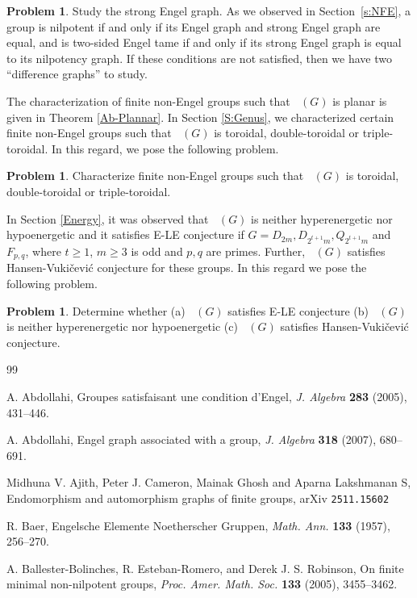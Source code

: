 \documentclass[reqno,12pt]{amsart}
\theoremstyle{plain}
\theoremstyle{definition}
\newtheorem{prob}[conj]{Problem}
\newcommand{\coeng}{\mathop{\mathcal{E}_c^-}}
\begin{document}
{\begin{prob}
Study the strong Engel graph. As we observed in Section~\ref{s:NFE},
a group is nilpotent if and only if its Engel graph and strong Engel graph are
equal, and is two-sided Engel tame if and only if its strong Engel graph is
equal to its nilpotency graph. If these conditions are not satisfied, then we
have two ``difference graphs'' to study.
\end{prob}

The characterization of finite non-Engel groups such that $\coeng(G)$ is planar is given in Theorem \ref{Ab-Plannar}. In Section \ref{S:Genus}, we characterized certain finite non-Engel groups such that $\coeng(G)$ is toroidal, double-toroidal or triple-toroidal. In this regard, we pose the following problem.
\begin{prob}
Characterize finite  non-Engel groups such that $\coeng(G)$ is  toroidal, double-toroidal or triple-toroidal.   
\end{prob}
In Section \ref{Energy}, it was observed that $\coeng(G)$ is neither hyperenergetic nor hypoenergetic and it satisfies E-LE conjecture if $G = D_{2m}, D_{2^{t+1}m}, Q_{2^{t+1}m}$ and $F_{p, q}$, where $t \geq 1$, $m \geq 3$ is odd and $p, q$ are primes. Further, $\coeng(G)$ satisfies Hansen-Vuki{\v{c}}evi{\'c} conjecture for these groups. In this regard we pose the following problem.
\begin{prob}
Determine whether (a) $\coeng(G)$  satisfies E-LE conjecture (b) $\coeng(G)$ is neither hyperenergetic nor hypoenergetic        
(c) $\coeng(G)$  satisfies Hansen-Vuki{\v{c}}evi{\'c} conjecture. 
\end{prob}
\begin{thebibliography}{99}

A. Abdollahi,
Groupes satisfaisant une condition d'Engel,
\textit{J. Algebra} \textbf{283} (2005), 431--446.

A. Abdollahi, 
Engel graph associated with a group,
\textit{J. Algebra} \textbf{318} (2007), 680--691.

Midhuna V. Ajith, Peter J. Cameron, Mainak Ghosh and Aparna Lakshmanan S,
Endomorphism and automorphism graphs of finite groups,
arXiv \texttt{2511.15602}

R. Baer,
Engelsche Elemente Noetherscher Gruppen,
\textit{Math. Ann.} \textbf{133} (1957), 256--270.

A. Ballester-Bolinches, R. Esteban-Romero, and Derek J. S. Robinson,
On finite minimal non-nilpotent groups,
\textit{Proc. Amer. Math. Soc.} \textbf{133} (2005), 3455--3462.


\end{thebibliography}}
\end{document}
